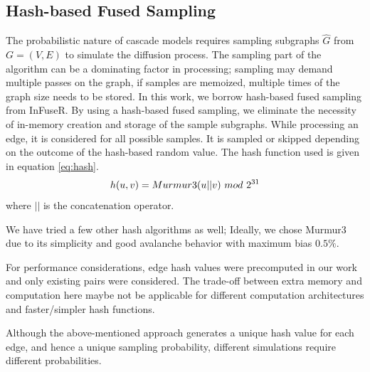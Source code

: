 \documentclass[10pt,journal,compsoc]{IEEEtran}
\begin{document}
\subsection{Hash-based Fused Sampling}
The probabilistic nature of cascade models requires sampling subgraphs $\hat{G}$ from $G = (V, E)$ to simulate the diffusion process. The sampling part of the algorithm can be a dominating factor in processing; sampling may demand multiple passes on the graph, if samples are memoized, multiple times of the graph size needs to be stored.
In this work, we borrow hash-based fused sampling from {\sc InFuseR}\cite{infuser}. By using a hash-based fused sampling, we eliminate the necessity of in-memory creation and storage of the sample subgraphs.
While processing an edge, it is considered for all possible samples.
It is sampled or skipped depending on the outcome of the hash-based random value. The hash function used is given in equation \ref{eq:hash}.
\begin{equation}
    \label{eq:hash}
    h(u,v) = \mbox{{\sc Murmur3}}(u||v)~mod~2^{31}  
\end{equation}
where $||$ is the concatenation operator. 

We have tried a few other hash algorithms as well; Ideally, we chose {{\sc Murmur3}} due to its simplicity and good avalanche behavior with maximum bias $0.5 \% $\cite{MurmurHash3Performance}.

For performance considerations, edge hash values were precomputed in our work and only existing pairs were considered. The trade-off between extra memory and computation here maybe not be applicable for different computation architectures and faster/simpler hash functions.

Although the above-mentioned approach generates a unique hash value for each edge, and hence a unique sampling probability, different simulations require different probabilities.
\end{document}
